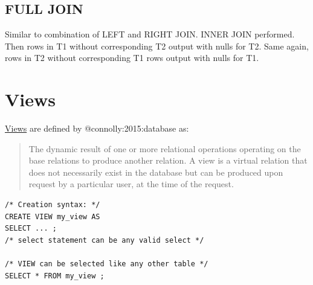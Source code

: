 \documentclass[slides]{pgnotes}
\begin{document}
\subsection{FULL JOIN}\label{full-join}

Similar to combination of LEFT and RIGHT JOIN. INNER JOIN performed.
Then rows in T1 without corresponding T2 output with nulls for T2. Same
again, rows in T2 without corresponding T1 rows output with nulls for
T1.


\section{Views}\label{sec:views}

\href{https://www.postgresql.org/docs/13/tutorial-views.html}{Views} are
defined by @connolly:2015:database as:

\begin{quote}
The dynamic result of one or more relational operations operating on the
base relations to produce another relation. A view is a virtual relation
that does not necessarily exist in the database but can be produced upon
request by a particular user, at the time of the request.
\end{quote}

\begin{verbatim}
/* Creation syntax: */
CREATE VIEW my_view AS
SELECT ... ;
/* select statement can be any valid select */

/* VIEW can be selected like any other table */
SELECT * FROM my_view ; 
\end{verbatim}
\end{document}

